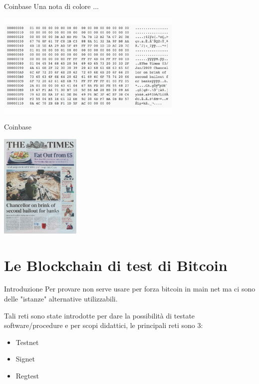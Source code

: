 \documentclass[aspectratio=169]{beamer}
\begin{document}
\begin{frame}{Coinbase}
    Una nota di colore ...
    \begin{center}
        \includegraphics[height=5cm]{raw.jpg}
    \end{center}
\end{frame}

\begin{frame}{Coinbase}
    \begin{center}
        \includegraphics[height=5cm]{times.png}
    \end{center}
\end{frame}

\section{Le Blockchain di test di Bitcoin}

\begin{frame}{Introduzione}
    Per provare non serve usare per forza bitcoin in main net ma ci sono delle "istanze" alternative utilizzabili.

    Tali reti sono state introdotte per dare la possibilità di testate software/procedure e per scopi didattici, le principali reti sono 3:
    \begin{itemize}
        \item Testnet
        \item Signet
        \item Regtest
    \end{itemize}


\end{frame}
\end{document}
